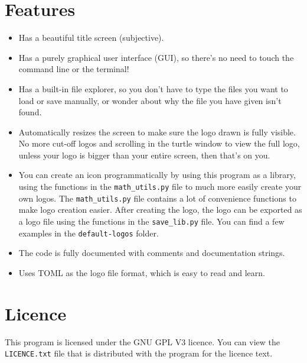\documentclass[11pt]{article}
\begin{document}
\section{Features}
\label{sec:orgc26ed64}
\begin{itemize}
\item Has a beautiful title screen (subjective).
\item Has a purely graphical user interface (GUI), so there's no need to touch the command line or the terminal!
\item Has a built-in file explorer, so you don't have to type the files you want to load or save manually, or wonder about why the file you have given isn't found.
\item Automatically resizes the screen to make sure the logo drawn is fully visible. No more cut-off logos and scrolling in the turtle window to view the full logo, unless your logo is bigger than your entire screen, then that's on you.
\item You can create an icon programmatically by using this program as a library, using the functions in the \texttt{math\_utils.py} file to much more easily create your own logos. The \texttt{math\_utils.py} file contains a lot of convenience functions to make logo creation easier. After creating the logo, the logo can be exported as a logo file using the functions in the \texttt{save\_lib.py} file. You can find a few examples in the \texttt{default-logos} folder.
\item The code is fully documented with comments and documentation strings.
\item Uses TOML as the logo file format, which is easy to read and learn.
\end{itemize}

\section{Licence}
\label{sec:org67b4471}
This program is licensed under the GNU GPL V3 licence. You can view the \texttt{LICENCE.txt} file that is distributed with the program for the licence text.
\end{document}
